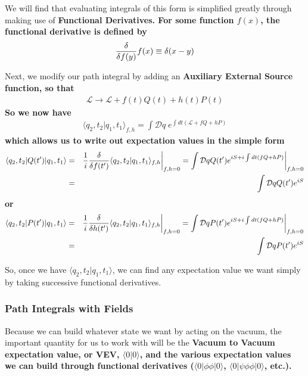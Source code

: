 \documentclass[12pt,epsf]{article}
\def\nolabel{\nonumber }
\def\nolabel{\nonumber }
\begin{document}
We will find that evaluating integrals of this form is simplified
greatly through making use of \bf Functional Derivatives\rm.  For some
function $f(x)$, the functional derivative is defined by 
\begin{eqnarray}
{\delta \over \delta f(y)} f(x) \equiv \delta (x-y)\nolabel
\end{eqnarray}

Next, we modify our path integral by adding an \bf Auxiliary External
Source \rm function, so that 
\begin{eqnarray}
\mathcal{L} \rightarrow \mathcal{L} + f(t)Q(t) + h(t)P(t)\nolabel
\end{eqnarray}
So we now have 
\begin{eqnarray}
\langle q_2,t_2|q_1,t_1\rangle_{f,h} = \int \mathcal{D}q \; e^{\int dt
(\mathcal{L} + fQ + hP)}\nolabel
\end{eqnarray}
which allows us to write out expectation values in the simple form
\begin{eqnarray}
\langle q_2,t_2|Q(t')|q_1,t_1\rangle &=& {1\over i} {\delta \over
\delta f(t')} \langle q_2,t_2|q_1,t_1\rangle_{f,h} \bigg|_{f,h =0} =
\int \mathcal{D}q Q(t')e^{iS + i \int dt(fQ+hP)} \bigg|_{f,h = 0}
\nolabel \\
&=& \int \mathcal{D}q Q(t')e^{iS}\nolabel
\end{eqnarray}
or
\begin{eqnarray}
\langle q_2,t_2|P(t')|q_1,t_1\rangle &=& {1\over i} {\delta \over
\delta h(t')} \langle q_2,t_2|q_1,t_1\rangle_{f,h} \bigg|_{f,h = 0} =
\int \mathcal{D}q P(t')e^{iS+i\int dt(fQ+hP)}\bigg|_{f,h=0} \nolabel \\
&=& \int \mathcal{D} q P(t')e^{iS}\nolabel
\end{eqnarray}

So, once we have $\langle q_2,t_2|q_1,t_1\rangle$, we can find any
expectation value we want simply by taking successive functional
derivatives.  

\subsubsection{Path Integrals with Fields}

Because we can build whatever state we want by acting on the vacuum,
the important quantity for us to work with will be the \bf Vacuum to
Vacuum \rm expectation value, or VEV, $\langle 0 | 0 \rangle$, and
the various expectation values we can build through functional
derivatives ($\langle 0 | \phi \phi|0 \rangle$, $\langle 0 | \psi \phi
\phi |0\rangle$, etc.).  
\end{document}

